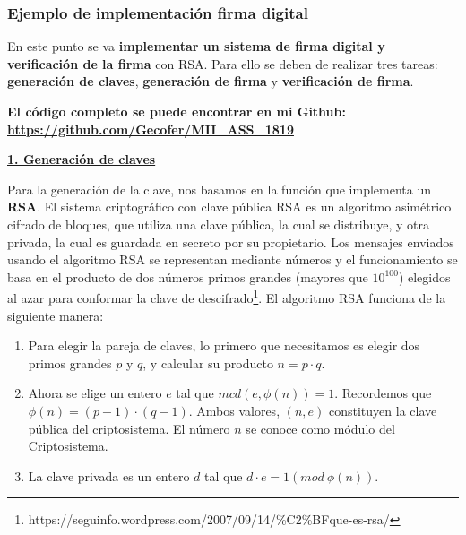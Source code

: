 \documentclass{manual}
\begin{document}





\subsubsection{Ejemplo de implementación firma digital}

En este punto se va \textbf{implementar un sistema de firma digital y verificación de la firma} con RSA. Para ello se deben de realizar tres tareas: \textbf{generación de claves}, \textbf{generación de firma} y \textbf{verificación de firma}.

\begin{center}\textbf{El código completo se puede encontrar en mi Github: \url{https://github.com/Gecofer/MII_ASS_1819}}\end{center}

\underline{\textbf{1. Generación de claves}}

Para la generación de la clave, nos basamos en la función que implementa un \textbf{RSA}. El sistema criptográfico con clave pública RSA es un algoritmo asimétrico cifrado de bloques, que utiliza una clave pública, la cual se distribuye, y otra privada, la cual es guardada en secreto por su propietario. Los mensajes enviados usando el algoritmo RSA se representan mediante números y el funcionamiento se basa en el producto de dos números primos grandes (mayores que $10^{100}$) elegidos al azar para conformar la clave de descifrado\footnote{https://seguinfo.wordpress.com/2007/09/14/\%C2\%BFque-es-rsa/}. El algoritmo RSA funciona de la siguiente manera:

\begin{enumerate}
	\item Para elegir la pareja de claves, lo primero que necesitamos es elegir dos primos grandes $p$ y $q$, y calcular su producto $n = p \cdot q$.
	
	\item Ahora se elige un entero $e$ tal que $mcd(e,\phi(n)) = 1$. Recordemos que $\phi(n) = (p-1)\cdot(q-1)$. Ambos valores, $(n, e)$ constituyen la clave pública del criptosistema. El número $n$ se conoce como módulo del Criptosistema.
	
	\item La clave privada es un entero $d$ tal que $d \cdot e = 1 (mod\ {\phi(n)})$.
\end{enumerate}
\end{document}
